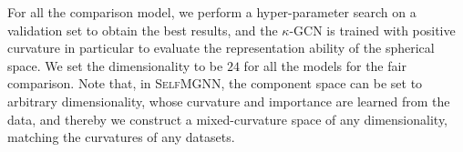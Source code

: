 For all the comparison model, we perform a hyper-parameter search on a validation set to obtain the best results, 
and the $\kappa$-GCN is trained with positive curvature in particular to evaluate the representation ability of the spherical space.
We set the dimensionality to be $24$ for all the models for the fair comparison.
Note that, in \textsc{SelfMGNN}, the component space can be set to arbitrary dimensionality, whose curvature and importance are learned from the data, and thereby we  construct a mixed-curvature space of  any dimensionality, matching the curvatures of any datasets.




